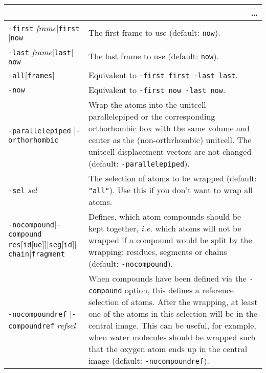 \documentclass[a4paper, DIV12]{scrartcl}
\newcommand{\ie}{\emph{i.e.}\xspace}
\begin{document}
\begin{longtable}{|p{}|p{}|}

\multicolumn{2}{r}{\dots}
\endfoot
\endlastfoot

\hline

\texttt{-molid} \textit{molid}$|$\texttt{top}
& Which molecule to use (default: \texttt{top})
\\ \hline

\texttt{-first} \textit{frame}$|$\texttt{first}$|$\texttt{now}
& The first frame to use (default: \texttt{now}).
\\ \hline

\texttt{-last} \textit{frame}$|$\texttt{last}$|$\texttt{now}
& The last frame to use (default: \texttt{now}).
\\ \hline

\texttt{-all}[\texttt{frames}]
& Equivalent to \texttt{-first first -last last}.
\\ \hline

\texttt{-now}
& Equivalent to \texttt{-first now -last now}.
\\ \hline

\texttt{-parallelepiped} $|$\texttt{-orthorhombic}
& Wrap the atoms into the unitcell parallelepiped or the corresponding
orthorhombic box with the same volume and center as the
(non-orthrhombic) unitcell. The unitcell displacement vectors are not
changed (default: \texttt{-parallelepiped}).
\\ \hline

\texttt{-sel} \textit{sel}
& The selection of atoms to be wrapped (default: \texttt{"all"}). Use
this if you don't want to wrap all atoms.
\\ \hline

\texttt{-nocompound}\linebreak $|$\texttt{-compound} \texttt{res}[\texttt{id}[\texttt{ue}]]$|$\texttt{seg}[\texttt{id}]$|$\texttt{chain}$|$\texttt{fragment}
& Defines, which atom compounds should be kept together, \ie which
atoms will not be wrapped if a compound would be split by the
wrapping: residues, segments or chains (default:
\texttt{-nocompound}).
\\ \hline

\texttt{-nocompoundref} $|$\texttt{-compoundref} \textit{refsel}
& When compounds have been defined via the \texttt{-compound} option,
this defines a reference selection of atoms. After the wrapping, at
least one of the atoms in this selection will be in the central
image. This can be useful, for example, when water molecules should be
wrapped such that the oxygen atom ends up in the central image
(default: \texttt{-nocompoundref}).
\\ \hline


\end{longtable}
\end{document}
